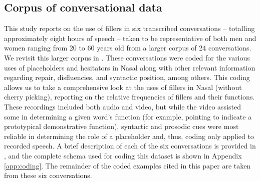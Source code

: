 \documentclass[output=paper,colorlinks,citecolor=brown
\ChapterDOI{10.5281/zenodo.15697585}
]{langscibook}
\begin{document}
\subsection{Corpus of conversational data}
This study reports on the use of fillers in six transcribed conversations -- totalling approximately eight hours of speech -- taken to be representative of both men and women ranging from 20 to 60 years old from a larger corpus of 24 conversations. We revisit this larger corpus in . These conversations were coded for the various uses of placeholders and hesitators in Nasal along with other relevant information regarding repair, disfluencies, and syntactic position, among others. This coding allows us to take a comprehensive look at the uses of fillers in Nasal (without cherry picking), reporting on the relative frequencies of fillers and their functions. These recordings included both audio and video, but while the video assisted some in determining a given word's function (for example, pointing to indicate a prototypical demonstrative function), syntactic and prosodic cues were most reliable in determining the role of a placeholder and, thus, coding only applied to recorded speech. A brief description of each of the six conversations is provided in , and the complete schema used for coding this dataset is shown in Appendix \ref{app:coding}. The remainder of the coded examples cited in this paper are taken from these six conversations.
\end{document}
